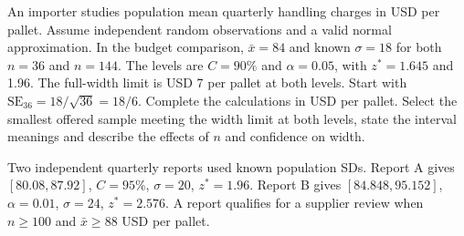 An importer studies population mean quarterly handling charges in USD per pallet. Assume independent random observations and a valid normal approximation. In the budget comparison, $\bar x=84$ and known $\sigma=18$ for both $n=36$ and $n=144$. The levels are $C=90\%$ and $\alpha=0.05$, with $z^*=1.645$ and 1.96. The full-width limit is USD 7 per pallet at both levels.
Start with $\mathrm{SE}_{36}=18/\sqrt{36}=18/6$. Complete the calculations in USD per pallet.
Select the smallest offered sample meeting the width limit at both levels, state the interval meanings and describe the effects of $n$ and confidence on width.\par\nopagebreak[4]
\guidedresponsebox[38mm]{\dimexpr\linewidth-1pt\relax}
\clearpage
{}
Two independent quarterly reports used known population SDs. Report A gives $[80.08,87.92]$, $C=95\%$, $\sigma=20$, $z^*=1.96$. Report B gives $[84.848,95.152]$, $\alpha=0.01$, $\sigma=24$, $z^*=2.576$. A report qualifies for a supplier review when $n\ge100$ and $\bar x\ge88$ USD per pallet.
